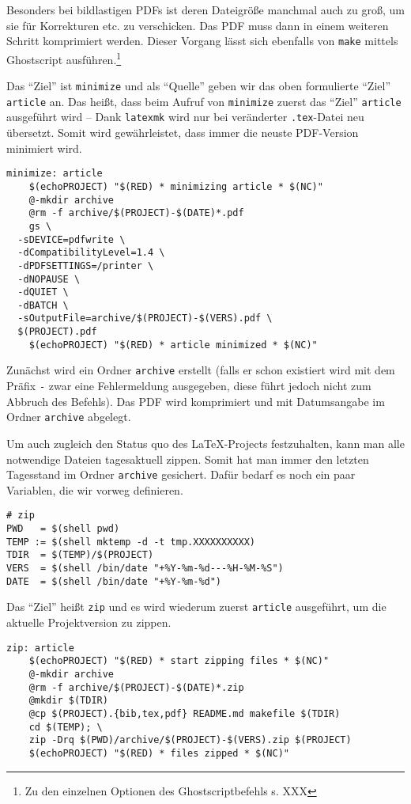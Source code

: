 \documentclass[ngerman]{dtk}
\begin{document}
Besonders bei bildlastigen PDFs ist deren Dateigröße manchmal auch zu groß,
um sie für Korrekturen etc. zu verschicken.
Das PDF muss dann in einem weiteren Schritt komprimiert werden.
Dieser Vorgang lässt sich ebenfalls von \texttt{make} mittels Ghostscript ausführen.\footnote{Zu den einzelnen Optionen des Ghostscriptbefehls s. XXX}

Das \enquote{Ziel} ist \texttt{minimize} und als \enquote{Quelle}
geben wir das oben formulierte \enquote{Ziel} \texttt{article} an.
Das heißt, dass beim Aufruf von \texttt{minimize} zuerst das
\enquote{Ziel} \texttt{article} ausgeführt wird -- Dank \texttt{latexmk} wird nur
bei veränderter \texttt{.tex}-Datei neu übersetzt.
Somit wird gewährleistet, dass  immer die neuste PDF-Version
minimiert wird.
\begin{lstlisting}[style=number]
minimize: article
	$(echoPROJECT) "$(RED) * minimizing article * $(NC)"
	@-mkdir archive
	@rm -f archive/$(PROJECT)-$(DATE)*.pdf
	gs \
  -sDEVICE=pdfwrite \
  -dCompatibilityLevel=1.4 \
  -dPDFSETTINGS=/printer \
  -dNOPAUSE \
  -dQUIET \
  -dBATCH \
  -sOutputFile=archive/$(PROJECT)-$(VERS).pdf \
  $(PROJECT).pdf
	$(echoPROJECT) "$(RED) * article minimized * $(NC)"
\end{lstlisting}
Zunächst wird ein Ordner \texttt{archive} erstellt (falls er schon existiert wird mit dem Präfix \texttt{-} zwar eine Fehlermeldung ausgegeben, diese führt jedoch nicht zum Abbruch des Befehls). Das PDF wird komprimiert und mit Datumsangabe im Ordner \texttt{archive} abgelegt.

Um auch zugleich den Status quo des \LaTeX -Projects festzuhalten,
kann man alle notwendige Dateien tagesaktuell zippen.
Somit hat man immer den letzten Tagesstand im Ordner \texttt{archive} gesichert.
Dafür bedarf es noch ein paar Variablen,
die wir vorweg definieren.
\begin{lstlisting}[style=number]
# zip
PWD   = $(shell pwd)
TEMP := $(shell mktemp -d -t tmp.XXXXXXXXXX)
TDIR  = $(TEMP)/$(PROJECT)
VERS  = $(shell /bin/date "+%Y-%m-%d---%H-%M-%S")
DATE  = $(shell /bin/date "+%Y-%m-%d")
\end{lstlisting}

Das \enquote{Ziel} heißt \texttt{zip} und es wird wiederum
zuerst \texttt{article} ausgeführt,
um die aktuelle Projektversion zu zippen.
\begin{lstlisting}[style=number]
zip: article
	$(echoPROJECT) "$(RED) * start zipping files * $(NC)"
	@-mkdir archive
	@rm -f archive/$(PROJECT)-$(DATE)*.zip
	@mkdir $(TDIR)
	@cp $(PROJECT).{bib,tex,pdf} README.md makefile $(TDIR)
	cd $(TEMP); \
	zip -Drq $(PWD)/archive/$(PROJECT)-$(VERS).zip $(PROJECT)
	$(echoPROJECT) "$(RED) * files zipped * $(NC)"
\end{lstlisting}
\end{document}
